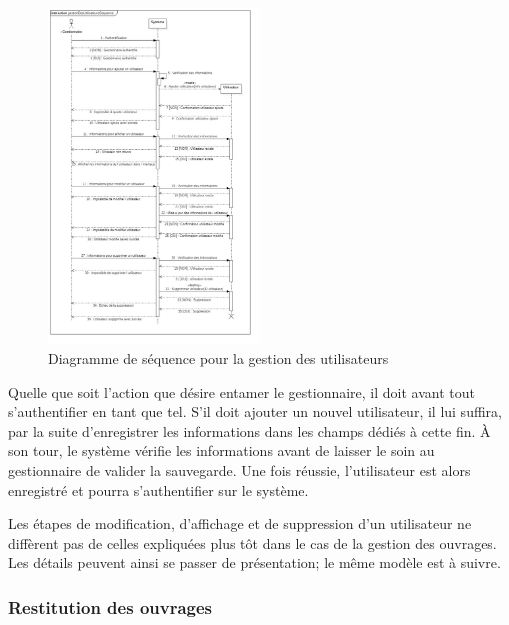 \paragraph{}
\begin{figure}[h]
        \centering
        \includegraphics[width=0.5\textwidth]{gestionDesUtilisateursSequence}
        \caption{Diagramme de séquence pour la gestion des utilisateurs}
        \label{image-gestionDesUtilisateursSequence}
        \end{figure}
\par
Quelle que soit l'action que désire entamer le gestionnaire, il doit avant tout s'authentifier
en tant que tel. S'il doit ajouter un nouvel utilisateur, il lui suffira, par la suite 
d'enregistrer les informations dans les champs dédiés à cette fin. À son tour, le système 
vérifie les informations avant de laisser le soin au gestionnaire de valider la sauvegarde.
Une fois réussie, l'utilisateur est alors enregistré et pourra s'authentifier sur le 
système. \par 
Les étapes de modification, d'affichage et de suppression d'un utilisateur ne diffèrent 
pas de celles expliquées plus tôt dans le cas de la gestion des ouvrages. Les détails 
peuvent ainsi se passer de présentation; le même modèle est à suivre.
\subsubsection{Restitution des ouvrages} 
